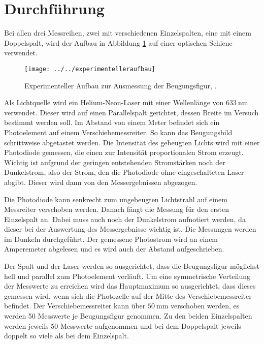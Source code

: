 \section{Durchführung}
\label{sec:Durchführung}
Bei allen drei Messreihen, zwei mit verschiedenen Einzelspalten, eine mit einem Doppelspalt, wird der Aufbau in Abbildung \ref{fig:experimentelleraufbau} auf einer optischen Schiene verwendet.
\begin{figure}[h!]
	\centering
	\texttt{[image: ../../experimentelleraufbau]}
	\caption{Experimenteller Aufbau zur Ausmessung der Beugungsfigur, \cite[7]{anleitung406}.}
	\label{fig:experimentelleraufbau}
\end{figure}
Als Lichtquelle wird ein Helium-Neon-Laser mit einer Wellenlänge von $\SI{633}{\nano\metre}$ verwendet. Dieser wird auf einen Parallelspalt gerichtet, dessen Breite im Versuch bestimmt werden soll. Im Abstand von einem Meter befindet sich ein Photoelement auf einem Verschiebemessreiter. So kann das Beugungsbild schrittweise abgetastet werden. Die Intensität des gebeugten Lichts wird mit einer Photodiode gemessen, die einen zur Intensität proportionalen Strom erzeugt. Wichtig ist aufgrund der geringen entstehenden Stromstärken noch der Dunkelstrom, also der Strom, den die Photodiode ohne eingeschalteten Laser abgibt. Dieser wird dann von den Messergebnissen abgezogen.

Die Photodiode kann senkrecht zum ungebeugten Lichtstrahl auf einem Messreiter verschoben werden. Danach fängt die Messung für den ersten Einzelspalt an. Dabei muss auch noch der Dunkelstrom aufnotiert werden, da dieser bei der Auswertung des Messergebnisse wichtig ist. Die Messungen werden im Dunkeln durchgeführt. Der gemessene Photostrom wird an einem Amperemeter abgelesen und es wird auch der Abstand aufgeschrieben. 

Der Spalt und der Laser werden so ausgerichtet, dass die Beugungsfigur möglichst hell und parallel zum Photoelement verläuft. Um eine symmetrische Verteilung der Messwerte zu erreichen wird das Hauptmaximum so ausgerichtet, dass dieses gemessen wird, wenn sich die Photozelle auf der Mitte des Verschiebemessreiter befindet. Der Verschiebemessreiter kann über $\SI{50}{\milli\meter}$ verschoben werden, es werden 50 Messwerte je Beugungsfigur genommen. Zu den beiden Einzelspalten werden jeweils 50 Messwerte aufgenommen und bei dem Doppelspalt jeweils doppelt so viele als bei dem Einzelspalt.